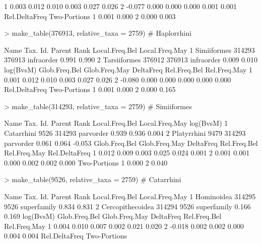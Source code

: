 \documentclass{article}
\begin{document}
\begin{Schunk}
\begin{Soutput}
1     0.003         0.012         0.010     0.003        0.027        0.026
2    -0.077         0.000         0.000     0.000        0.001        0.001
  Rel.DeltaFreq Two-Portions
1         0.001        0.000
2         0.000        0.003
\end{Soutput}
\begin{Sinput}
> make_table(376913, relative_taxa = 2759) # Haplorrhini
\end{Sinput}
\begin{Soutput}
          Name Tax. Id. Parent       Rank Local.Freq.Bel Local.Freq.May
1  Simiiformes   314293 376913 infraorder          0.991          0.990
2 Tarsiiformes   376912 376913 infraorder          0.009          0.010
  log(BvsM) Glob.Freq.Bel Glob.Freq.May DeltaFreq Rel.Freq.Bel Rel.Freq.May
1     0.001         0.012         0.010     0.003        0.027        0.026
2    -0.080         0.000         0.000     0.000        0.000        0.000
  Rel.DeltaFreq Two-Portions
1         0.001        0.000
2         0.000        0.165
\end{Soutput}
\begin{Sinput}
> make_table(314293, relative_taxa = 2759) # Simiiformes
\end{Sinput}
\begin{Soutput}
         Name Tax. Id. Parent      Rank Local.Freq.Bel Local.Freq.May log(BvsM)
1  Catarrhini     9526 314293 parvorder          0.939          0.936     0.004
2 Platyrrhini     9479 314293 parvorder          0.061          0.064    -0.053
  Glob.Freq.Bel Glob.Freq.May DeltaFreq Rel.Freq.Bel Rel.Freq.May Rel.DeltaFreq
1         0.012         0.009     0.003        0.025        0.024         0.001
2         0.001         0.001     0.000        0.002        0.002         0.000
  Two-Portions
1        0.000
2        0.040
\end{Soutput}
\begin{Sinput}
> make_table(9526, relative_taxa = 2759) # Catarrhini
\end{Sinput}
\begin{Soutput}
              Name Tax. Id. Parent        Rank Local.Freq.Bel Local.Freq.May
1       Hominoidea   314295   9526 superfamily          0.834          0.831
2 Cercopithecoidea   314294   9526 superfamily          0.166          0.169
  log(BvsM) Glob.Freq.Bel Glob.Freq.May DeltaFreq Rel.Freq.Bel Rel.Freq.May
1     0.004         0.010         0.007     0.002        0.021        0.020
2    -0.018         0.002         0.002     0.000        0.004        0.004
  Rel.DeltaFreq Two-Portions

\end{Soutput}
\end{Schunk}
\end{document}
